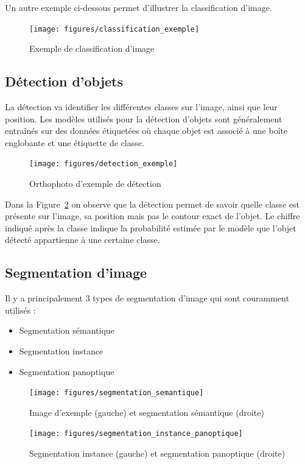 Un autre exemple \citep{ultralytics_classification_2024} ci-dessous permet d'illustrer la classification d'image.

\begin{figure}[htbp]
    \centering
    \texttt{[image: figures/classification\_exemple]}
    \caption{Exemple de classification d'image \citep{ultralytics_classification_2024}}
    \label{fig:classification_exemple}
\end{figure}

\subsection{Détection d'objets}

La détection va identifier les différentes classes sur l'image, ainsi que leur position. Les modèles utilisés pour la détection d'objets sont généralement entraînés sur des données étiquetées où chaque objet est associé à une boîte englobante et une étiquette de classe.

\begin{figure}[htbp]
    \centering
    \texttt{[image: figures/detection\_exemple]}
    \caption{Orthophoto d'exemple de détection \citep{sitg_orthophoto_2024}}
    \label{fig:detection_exemple}
\end{figure}

Dans la Figure~\ref{fig:detection_exemple} on observe que la détection permet de savoir quelle classe est présente sur l'image, sa position mais pas le contour exact de l'objet. Le chiffre indiqué après la classe indique la probabilité estimée par le modèle que l'objet détecté appartienne à une certaine classe.

\subsection{Segmentation d'image}

Il y a principalement 3 types de segmentation d'image qui sont couramment utilisés :
\begin{itemize}
    \item Segmentation sémantique
    \item Segmentation instance
    \item Segmentation panoptique
\end{itemize}

\begin{figure}[htbp]
    \centering
    \begin{minipage}[b]{0.48\textwidth}
        \centering
        \texttt{[image: figures/segmentation\_semantique]}
        \caption{Image d'exemple (gauche) et segmentation sémantique (droite) \citep{jung_2022}}
        \label{fig:segmentation_semantique}
    \end{minipage}
    \hfill
    \begin{minipage}[b]{0.48\textwidth}
        \centering
        \texttt{[image: figures/segmentation\_instance\_panoptique]}
        \caption{Segmentation instance (gauche) et segmentation panoptique (droite) \citep{jung_2022}}
        \label{fig:segmentation_instance_panoptique}
    \end{minipage}
\end{figure}

